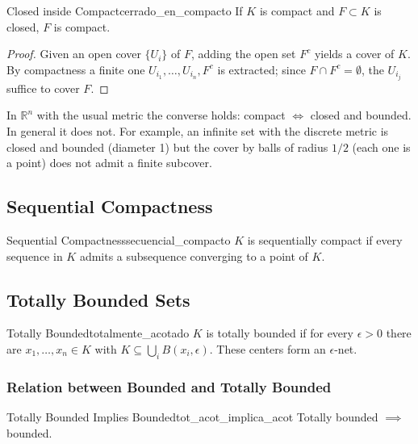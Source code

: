 \documentclass[11pt, a4paper]{article}
\begin{document}
\begin{proposicion}{Closed inside Compact}{cerrado_en_compacto}
If $K$ is compact and $F \subset K$ is closed, $F$ is compact.
\end{proposicion}

\begin{proof}
Given an open cover $\{U_i\}$ of $F$, adding the open set $F^c$ yields a
cover of $K$. By compactness a finite one $U_{i_1}, \dots, U_{i_n}, F^c$ is extracted; since
$F \cap F^c = \emptyset$, the $U_{i_j}$ suffice to cover $F$.
\end{proof}

\obs In $\mathbb{R}^n$ with the usual metric the converse holds: compact $\iff$ closed and
bounded. In general it does not. For example, an infinite set with the discrete metric is closed and
bounded (diameter 1) but the cover by balls of radius $1/2$ (each one is a point) does not admit a
finite subcover.


\subsection{Sequential Compactness}

\begin{definicion}{Sequential Compactness}{secuencial_compacto}
$K$ is sequentially compact if every sequence in $K$ admits a subsequence converging to a
point of $K$.
\end{definicion}

\subsection{Totally Bounded Sets}

\begin{definicion}{Totally Bounded}{totalmente_acotado}
$K$ is totally bounded if for every $\epsilon > 0$ there are $x_1, \dots, x_n \in K$ with
$K \subseteq \bigcup_i B(x_i, \epsilon)$. These centers form an $\epsilon$-net.
\end{definicion}

\subsubsection{Relation between Bounded and Totally Bounded}

\begin{proposicion}{Totally Bounded Implies Bounded}{tot_acot_implica_acot}
Totally bounded $\implies$ bounded.
\end{proposicion}
\end{document}
